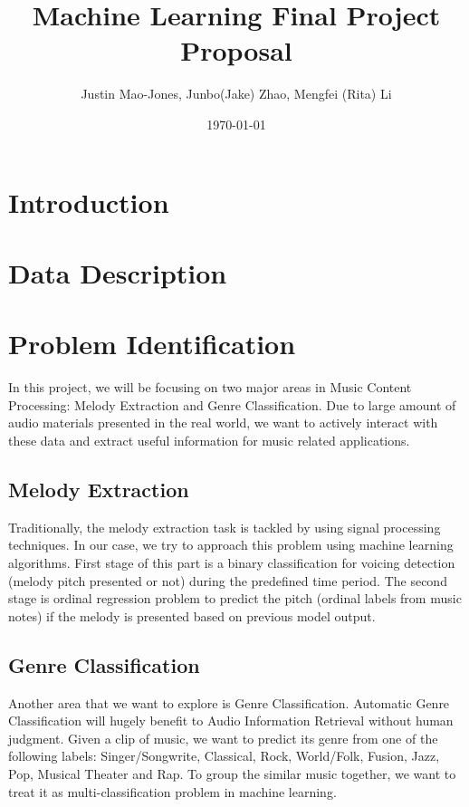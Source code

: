 \documentclass[12pt]{article}
\begin{document}
\title{Machine Learning Final Project Proposal}
\author{Justin Mao-Jones, Junbo(Jake) Zhao, Mengfei (Rita) Li}
\date{\today}


\maketitle

\section{Introduction} %
 


\section{Data Description}
   

\section{Problem Identification}
In this project, we will be focusing on two major areas in Music Content Processing: Melody Extraction and Genre Classification. Due to large amount of audio materials presented in the real world, we want to actively interact with these data and extract useful information for music related applications.

\subsection{Melody Extraction}
Traditionally, the melody extraction task is tackled by using signal processing techniques. In our case, we try to approach this problem using machine learning algorithms. First stage of this part is a binary classification for voicing detection (melody pitch presented or not) during the predefined time period. The second stage is ordinal regression problem %
to predict the pitch (ordinal labels from music notes) if the melody is presented based on previous model output.

\subsection{Genre Classification}
Another area that we want to explore is Genre Classification. Automatic Genre Classification will hugely benefit to Audio Information Retrieval without human judgment. Given a clip of music, we want to predict its genre from one of the following labels: Singer/Songwrite, Classical, Rock, World/Folk, Fusion, Jazz, Pop, Musical Theater and Rap. To group the similar music together, we want to treat it as multi-classification problem in machine learning. 
\end{document}
